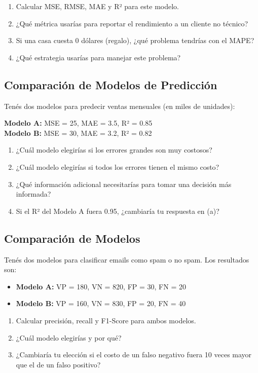 \documentclass[12pt]{article}
\begin{document}
\begin{enumerate}
    \item[a.] Calcular MSE, RMSE, MAE y R² para este modelo.
    \item[b.] ¿Qué métrica usarías para reportar el rendimiento a un cliente no técnico?
    \item[c.] Si una casa cuesta 0 dólares (regalo), ¿qué problema tendrías con el MAPE?
    \item[d.] ¿Qué estrategia usarías para manejar este problema?
\end{enumerate}

\subsection{Comparación de Modelos de Predicción}

Tenés dos modelos para predecir ventas mensuales (en miles de unidades):

\textbf{Modelo A:} MSE = 25, MAE = 3.5, R² = 0.85 \\
\textbf{Modelo B:} MSE = 30, MAE = 3.2, R² = 0.82

\begin{enumerate}
    \item[a.] ¿Cuál modelo elegirías si los errores grandes son muy costosos?
    \item[b.] ¿Cuál modelo elegirías si todos los errores tienen el mismo costo?
    \item[c.] ¿Qué información adicional necesitarías para tomar una decisión más informada?
    \item[d.] Si el R² del Modelo A fuera 0.95, ¿cambiaría tu respuesta en (a)?
\end{enumerate}

\subsection{Comparación de Modelos}

Tenés dos modelos para clasificar emails como spam o no spam. Los resultados son: 
\begin{itemize}
    \item \textbf{Modelo A:} VP = 180, VN = 820, FP = 30, FN = 20
    \item \textbf{Modelo B:} VP = 160, VN = 830, FP = 20, FN = 40
\end{itemize}

\begin{enumerate}
    \item[a.] Calcular precisión, recall y F1-Score para ambos modelos.
    \item[b.] ¿Cuál modelo elegirías y por qué?
    \item[c.] ¿Cambiaría tu elección si el costo de un falso negativo fuera 10 veces mayor que el de un falso positivo?
\end{enumerate}
\end{document}
